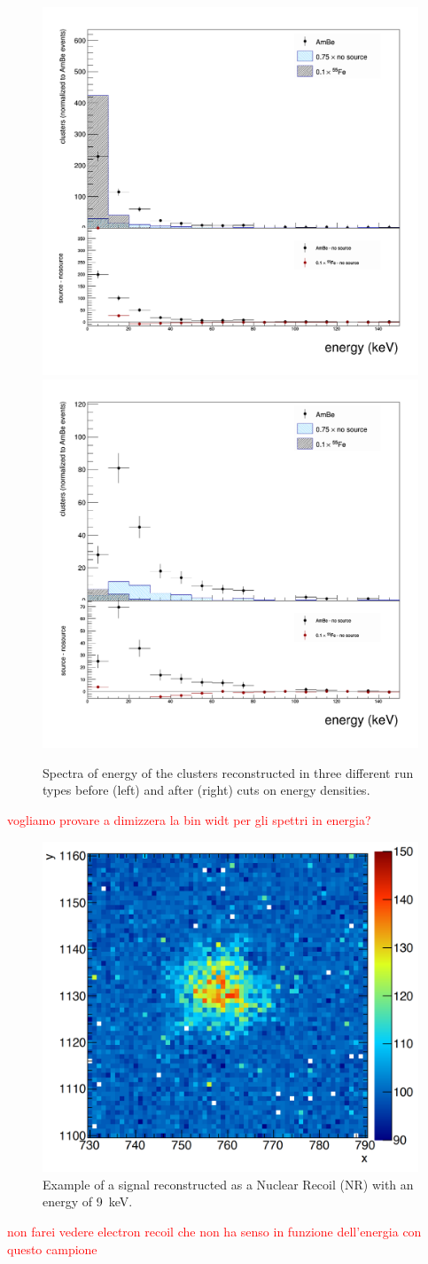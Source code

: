 \documentclass[12pt]{iopart}
\begin{document}
\begin{figure}[ht]
	\centering
	\includegraphics[width=0.45\linewidth]{energyExt.png}
	\includegraphics[width=0.45\linewidth]{energyExt_cut.png}
  	\caption{Spectra of energy of the clusters reconstructed in three different run types before (left) and after (right) cuts on energy densities.}
  	\label{fig:energy}
\end{figure}
\textcolor{red}{vogliamo provare a dimizzera la bin widt per gli spettri in energia?}
\begin{figure}[ht]
	\centering
	\includegraphics[width=0.50\linewidth]{granchio.png}
  	\caption{Example of a signal reconstructed as a Nuclear Recoil (NR) with an energy of 9~keV.}
  	\label{fig:granchio}
\end{figure}

\textcolor{red}{non farei vedere electron recoil che non ha senso in funzione dell'energia con questo campione }



\end{document}
